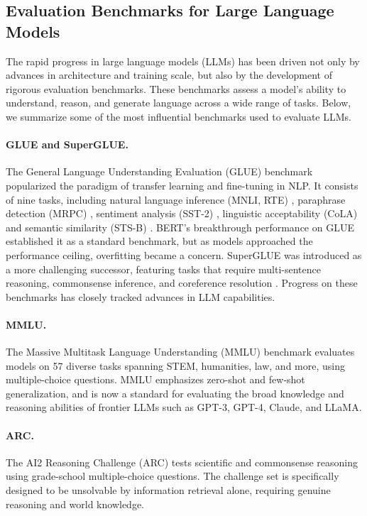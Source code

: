 \subsection{Evaluation Benchmarks for Large Language Models}
The rapid progress in large language models (LLMs) has been driven not only by advances in architecture and training scale, but also by the development of rigorous evaluation benchmarks. These benchmarks assess a model's ability to understand, reason, and generate language across a wide range of tasks. Below, we summarize some of the most influential benchmarks used to evaluate LLMs.
\paragraph{GLUE and SuperGLUE.} The General Language Understanding Evaluation (GLUE) benchmark \citep{wang2018glue} popularized the paradigm of transfer learning and fine-tuning in NLP. It consists of nine tasks, including natural language inference (MNLI, RTE) \citep{williams2018mnli,dagan2006rte}, paraphrase detection (MRPC) \citep{dolan2005mrpc}, sentiment analysis (SST-2) \citep{socher2013sst}, linguistic acceptability (CoLA) \citep{warstadt2019cola} and semantic similarity (STS-B) \citep{cer2017stsb}. BERT's breakthrough performance on GLUE established it as a standard benchmark, but as models approached the performance ceiling, overfitting became a concern. SuperGLUE \citep{wang2019superglue} was introduced as a more challenging successor, featuring tasks that require multi-sentence reasoning, commonsense inference, and coreference resolution \citep{zhang2018record,pilehvar2019wic,khashabi2018multirc,roemmele2011copa}. Progress on these benchmarks has closely tracked advances in LLM capabilities.

\paragraph{MMLU.} The Massive Multitask Language Understanding (MMLU) benchmark \citep{hendrycks2021mmlu} evaluates models on 57 diverse tasks spanning STEM, humanities, law, and more, using multiple-choice questions. MMLU emphasizes zero-shot and few-shot generalization, and is now a standard for evaluating the broad knowledge and reasoning abilities of frontier LLMs such as GPT-3, GPT-4, Claude, and LLaMA.

\paragraph{ARC.} The AI2 Reasoning Challenge (ARC) \citep{clark2018arc} tests scientific and commonsense reasoning using grade-school multiple-choice questions. The challenge set is specifically designed to be unsolvable by information retrieval alone, requiring genuine reasoning and world knowledge.

